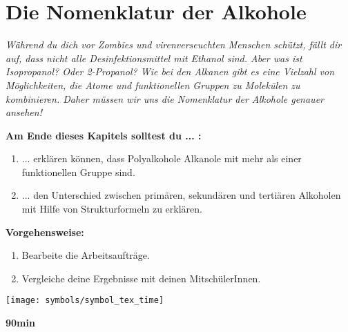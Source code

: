 \documentclass{scrartcl}  %
\begin{document}
		\section{Die Nomenklatur der Alkohole}

			\textit{Während du dich vor Zombies und virenverseuchten Menschen schützt, fällt dir auf, dass nicht alle Desinfektionsmittel mit Ethanol sind. Aber was ist Isopropanol? Oder 2-Propanol? Wie bei den Alkanen gibt es eine Vielzahl von Möglichkeiten, die Atome und funktionellen Gruppen zu Molekülen zu kombinieren. Daher müssen wir uns die Nomenklatur der Alkohole genauer ansehen!} \newline
			
			\begin{minipage}{0.7\textwidth}
				\noindent \textbf{Am Ende dieses Kapitels solltest du ... :}
				\begin{enumerate}
				    \item ... erklären können, dass Polyalkohole Alkanole mit mehr als einer funktionellen Gruppe sind.
				    \item ... den Unterschied zwischen primären, sekundären und tertiären Alkoholen mit Hilfe von Strukturformeln zu erklären. 
				\end{enumerate}	
				
				\noindent \textbf{Vorgehensweise:}
				\begin{enumerate}
					\item Bearbeite die Arbeitsaufträge. 
					\item Vergleiche deine Ergebnisse mit deinen MitschülerInnen.
				\end{enumerate}	
			\end{minipage}
			\hspace{0.1\textwidth}
			\begin{minipage}{0.2\textwidth}
				\begin{tcolorbox}
					[enhanced,
					width=0.9\textwidth,
					colback=white,
					colframe=black,
					fonttitle=\sffamily\bfseries\large, 
					title=Zeit,  %
					attach boxed title to top center={xshift=-0.0mm,yshift=-0.50mm},
					boxed title style={skin=enhancedfirst jigsaw,size=small,arc=1mm,bottom=-1mm,colframe=black,height=0.75cm},
					colbacktitle=black,
					drop lifted shadow]
					\centering
					\texttt{[image: symbols/symbol\_tex\_time]}
					
					\begin{center}
						\textbf{90min}
					\end{center}
				\end{tcolorbox}
			\end{minipage}
			
\end{document}
